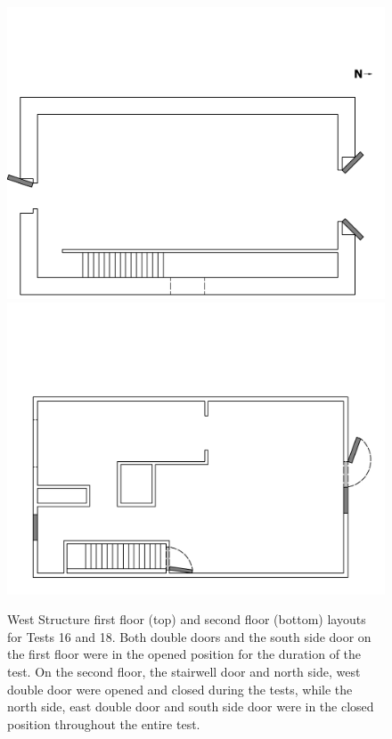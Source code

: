 \documentclass[12pt,oneside]{book}
\begin{document}
\begin{figure}[!ht]
\includegraphics[trim=0cm 0cm 0.75cm 4.5cm, clip=true, width=6in]{../Drawings/Specific_Tests/West_Structure_Hose_Test_18_1st_Floor}
\\
\includegraphics[trim=0cm 0cm 0.75cm 5cm, clip=true, width=6in]{../Drawings/Specific_Tests/West_Structure_Hose_Test_18_2nd_Floor}
\caption[West Structure Layout for Tests 16 and 18]{West Structure first floor (top) and second floor (bottom) layouts for Tests 16 and 18. Both double doors and the south side door on the first floor were in the opened position for the duration of the test. On the second floor, the stairwell door and north side, west double door were opened and closed during the tests, while the north side, east double door and south side door were in the closed position throughout the entire test.}
\label{fig:flow_path_1}
\end{figure}
\FloatBarrier
\end{document}
